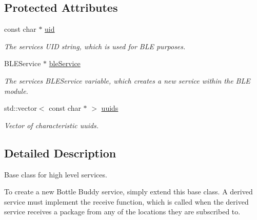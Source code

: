\subsection*{Protected Attributes}
\begin{DoxyCompactItemize}
\item 
const char $\ast$ \hyperlink{class_bottle_buddy_1_1_embedded_1_1_pipeline_1_1_service_af290f9aa0a6dca36e802e615fab19f78}{uid}\hypertarget{class_bottle_buddy_1_1_embedded_1_1_pipeline_1_1_service_af290f9aa0a6dca36e802e615fab19f78}{}\label{class_bottle_buddy_1_1_embedded_1_1_pipeline_1_1_service_af290f9aa0a6dca36e802e615fab19f78}

\begin{DoxyCompactList}\small\item\em The service\textquotesingle{}s U\+ID string, which is used for B\+LE purposes. \end{DoxyCompactList}\item 
B\+L\+E\+Service $\ast$ \hyperlink{class_bottle_buddy_1_1_embedded_1_1_pipeline_1_1_service_a630b006fa103113e214455827c5f0b9b}{ble\+Service}\hypertarget{class_bottle_buddy_1_1_embedded_1_1_pipeline_1_1_service_a630b006fa103113e214455827c5f0b9b}{}\label{class_bottle_buddy_1_1_embedded_1_1_pipeline_1_1_service_a630b006fa103113e214455827c5f0b9b}

\begin{DoxyCompactList}\small\item\em The services B\+L\+E\+Service variable, which creates a new service within the B\+LE module. \end{DoxyCompactList}\item 
std\+::vector$<$ const char $\ast$ $>$ \hyperlink{class_bottle_buddy_1_1_embedded_1_1_pipeline_1_1_service_a543fc4a07564a076ffc2835510763e5f}{uuids}
\begin{DoxyCompactList}\small\item\em Vector of characteristic uuids. \end{DoxyCompactList}\end{DoxyCompactItemize}


\subsection{Detailed Description}
Base class for high level services. 

To create a new Bottle Buddy service, simply extend this base class. A derived service must implement the receive function, which is called when the derived service receives a package from any of the locations they are subscribed to.

